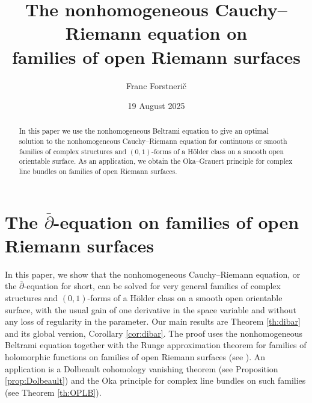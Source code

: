 \documentclass[11pt]{amsart}
\numberwithin{equation}{section}
\theoremstyle{definition}
\newcommand\dibar{\overline\partial}
\begin{document}
 

\title{The nonhomogeneous Cauchy--Riemann equation on \\ families of open Riemann surfaces}

\author{Franc Forstneri{\v c}}

\address{Franc Forstneri\v c, Faculty of Mathematics and Physics, University of Ljubljana, and Institute of Mathematics, Physics, and Mechanics, Jadranska 19, 1000 Ljubljana, Slovenia}



\date{19 August 2025}


\begin{abstract}
In this paper we use the nonhomogeneous Beltrami equation 
to give an optimal solution to the nonhomogeneous Cauchy--Riemann equation
for continuous or smooth families of complex structures and $(0,1)$-forms
of a H\"older class on a smooth open orientable surface. As an application, we obtain the Oka--Grauert principle for complex line bundles on families
of open Riemann surfaces. 
\end{abstract}

\maketitle

%
%
\section{The $\dibar$-equation on families of open Riemann surfaces}
\label{sec:dibar}

In this paper, we show that the nonhomogeneous Cauchy--Riemann
equation, or the $\dibar$-equation for short, can be solved for very
general families of complex structures and $(0,1)$-forms of a H\"older class
on a smooth open orientable surface, with the usual gain of one derivative 
in the space variable and without any loss of regularity in the parameter. 
Our main results are Theorem \ref{th:dibar} and its global version, 
Corollary \ref{cor:dibar}. The proof uses the
nonhomogeneous Beltrami equation 
together with the Runge approximation theorem for families
of holomorphic functions on families of open Riemann surfaces
(see \cite[Theorem 1.1]{Forstneric2024Runge}). An application 
is a Dolbeault cohomology vanishing theorem 
(see Proposition \ref{prop:Dolbeault}) and the Oka principle
for complex line bundles on such families (see Theorem \ref{th:OPLB}).
\end{document}
